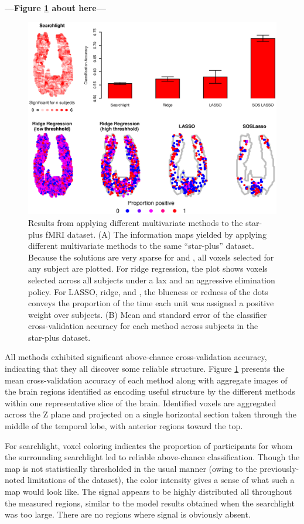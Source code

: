 \begin{center}
\textbf{---Figure \ref{fig.brain} about here---}
\end{center}

\begin{figure}
\centering
\includegraphics[width=.8\textwidth]{figures/figure10.eps}
\caption{Results from applying different multivariate methods to the star-plus fMRI dataset. (A) The information maps yielded by applying different multivariate methods to the same ``star-plus'' dataset. Because the solutions are very sparse for {\lasso} and {\soslasso}, all voxels selected for any subject are plotted. For ridge regression, the plot shows voxels selected across all subjects under a lax and an aggressive elimination policy. For LASSO, ridge, and {\soslasso}, the blueness or redness of the dots conveys the proportion of the time each unit was assigned a positive weight over subjects. (B) Mean and standard error of the classifier cross-validation accuracy for each method across subjects in the star-plus dataset.}
\label{fig.brain}  
\end{figure}

All methods exhibited significant above-chance cross-validation accuracy, indicating that they all discover some reliable structure. Figure \ref{fig.brain} presents the mean cross-validation accuracy of each method along with aggregate images of the brain regions identified as encoding useful structure by the different methods within one representative slice of the brain.  Identified voxels are aggregated across the Z plane and projected on a single horizontal section taken through the middle of the temporal lobe, with anterior regions toward the top. 

For searchlight, voxel coloring indicates the proportion of participants for whom the surrounding searchlight led to reliable above-chance classification. Though the map is not statistically thresholded in the usual manner (owing to the previously-noted limitations of the dataset), the color intensity gives a sense of what such a map would look like. The signal appears to be highly distributed all throughout the measured regions, similar to the model results obtained when the searchlight was too large. There are no regions where signal is obviously absent. 

